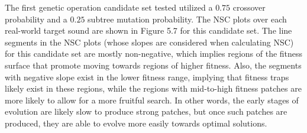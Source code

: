 \documentclass[a4paper,12pt]{report} 	%
\numberwithin{figure}{chapter}
\numberwithin{table}{chapter}
\numberwithin{equation}{chapter}
\begin{document}
\begin{flushleft}
The first genetic operation candidate set tested utilized a $0.75$ crossover probability and a $0.25$ subtree mutation probability. The NSC plots over each real-world target sound are shown in Figure 5.7 for this candidate set.
The line segments in the NSC plots (whose slopes are considered when calculating NSC) for this candidate set are mostly non-negative, which implies regions of the fitness surface that promote moving towards regions of higher fitness. Also, the segments with negative slope exist in the lower fitness range, implying that fitness traps likely exist in these regions, while the regions with mid-to-high fitness patches are more likely to allow for a more fruitful search. In other words, the early stages of evolution are likely slow to produce strong patches, but once such patches are produced, they are able to evolve more easily towards optimal solutions.


\end{flushleft}
\end{document}
